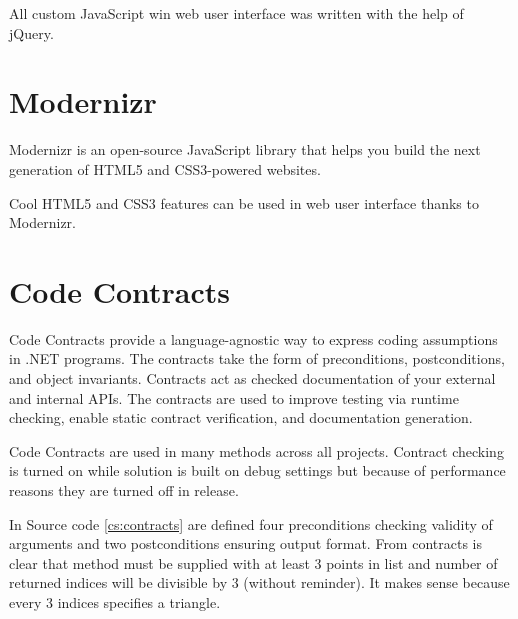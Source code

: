 All custom JavaScript win web user interface was written with the help of jQuery.


\section{Modernizr}
\label{sec:Modernizr}

\noindent
Modernizr is an open-source JavaScript library that helps you build the next generation of HTML5 and CSS3-powered websites.

Cool HTML5 and CSS3 features can be used in web user interface thanks to Modernizr.


\section{Code Contracts}
\label{sec:CodeContracts}

\noindent
Code Contracts provide a language-agnostic way to express coding assumptions in .NET programs.
The contracts take the form of preconditions, postconditions, and object invariants.
Contracts act as checked documentation of your external and internal APIs.
The contracts are used to improve testing via runtime checking, enable static contract verification, and documentation generation.

Code Contracts are used in many methods across all projects.
Contract checking is turned on while solution is built on debug settings but because of performance reasons they are turned off in release.

In Source code \ref{cs:contracts} are defined four preconditions checking validity of arguments and two postconditions ensuring output format.
From contracts is clear that method must be supplied with at least 3 points in list and number of returned indices will be divisible by 3 (without reminder).
It makes sense because every 3 indices specifies a triangle.



